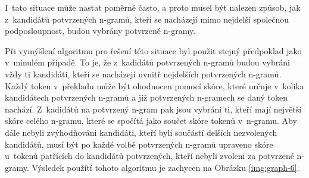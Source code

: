 I~tato situace může nastat poměrně často,
  a proto musel být nalezen způsob,
  jak z~kandidátů potvrzených \mbox{n-gramů},
  kteří se nacházejí mimo nejdelší společnou podposloupnost,
  budou vybrány potvrzené \mbox{n-gramy}. 


Při vymýšlení algoritmu pro řešení této situace byl použit stejný předpoklad jako v~minulém případě.
To je, že z~kadidátů potvrzených \mbox{n-gramů} budou vybráni vždy ti kandidáti,
  kteří se nacházejí uvnitř nejdelších potvrzených \mbox{n-gramů}.
Každý token v~překladu může být ohodnocen pomocí skóre,
  které určuje v~kolika kandidátech potvrzených \mbox{n-gramů} a již potvrzených \mbox{n-gramech} se daný token nachází.
Z~kadidátů na potvrzený \mbox{n-gram} pak jsou vybráni ti,
  kteří mají největší skóre celého \mbox{n-gramu},
  které se spočítá jako součet skóre tokenů v~\mbox{n-gramu}.
Aby dále nebyli zvýhodňováni kandidáti,
  kteří byli součástí delších nezvolených kandidátů,
  musí být po každé volbě potvrzených \mbox{n-gramů} upraveno skóre u~tokenů patřících do kandidátů potvrzených,
  kteří nebyli zvoleni za potvrzené \mbox{n-gramy}.
Výsledek použítí tohoto algoritmu je zachycen na Obrázku \ref{img:graph-6}.

